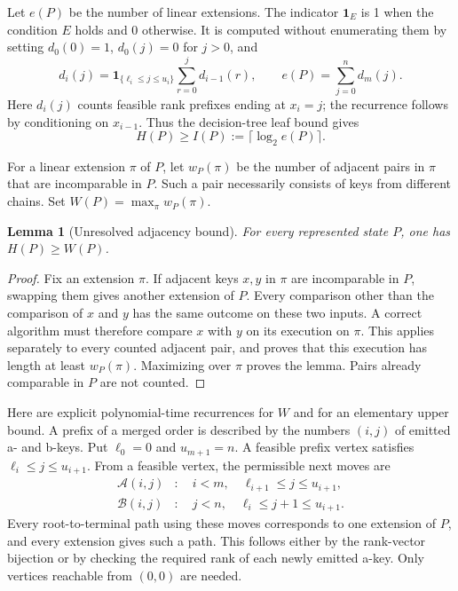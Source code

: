 \documentclass[11pt]{article}
\newtheorem{lemma}[theorem]{Lemma}
\theoremstyle{definition}
\theoremstyle{remark}
\begin{document}
Let $e(P)$ be the number of linear extensions. The indicator $\mathbf 1_E$ is 1 when the condition $E$ holds and 0 otherwise.  It is computed without
enumerating them by setting $d_0(0)=1$, $d_0(j)=0$ for $j>0$, and
\begin{equation}\label{ex:count}
 d_i(j)=\mathbf 1_{\{\ell_i\le j\le u_i\}}
                  \sum_{r=0}^j d_{i-1}(r),
 \qquad e(P)=\sum_{j=0}^n d_m(j).
\end{equation}
Here $d_i(j)$ counts feasible rank prefixes ending at $x_i=j$; the recurrence
follows by conditioning on $x_{i-1}$.  Thus the decision-tree leaf bound gives
\begin{equation}\label{ex:information}
                     H(P)\ge I(P):=\lceil\log_2 e(P)\rceil.
\end{equation}

For a linear extension $\pi$ of $P$, let $w_P(\pi)$ be the number of adjacent
pairs in $\pi$ that are incomparable in $P$.  Such a pair necessarily consists
of keys from different chains.  Set $W(P)=\max_\pi w_P(\pi)$.

\begin{lemma}[Unresolved adjacency bound]\label{ex:adjacency-lemma}
For every represented state $P$, one has $H(P)\ge W(P)$.

\end{lemma}
\begin{proof}
Fix an extension $\pi$.  If adjacent keys $x,y$ in $\pi$ are incomparable in
$P$, swapping them gives another extension of $P$.  Every comparison other
than the comparison of $x$ and $y$ has the same outcome on these two inputs.
A correct algorithm must therefore compare $x$ with $y$ on its execution on
$\pi$.  This applies separately to every counted adjacent pair, and proves
that this execution has length at least $w_P(\pi)$.  Maximizing over $\pi$
proves the lemma.  Pairs already comparable in $P$ are not counted.
\end{proof}

Here are explicit polynomial-time recurrences for $W$ and for an elementary
upper bound.  A prefix of a merged order is described by the numbers $(i,j)$
of emitted a- and b-keys.  Put $\ell_0=0$ and $u_{m+1}=n$.
A feasible prefix vertex satisfies $\ell_i\le j\le u_{i+1}$.
From a feasible vertex, the permissible next moves are
\begin{align*}
 \mathcal A(i,j)&:\quad i<m,\quad \ell_{i+1}\le j\le u_{i+1},\\
 \mathcal B(i,j)&:\quad j<n,\quad \ell_i\le j+1\le u_{i+1}.
\end{align*}
Every root-to-terminal path using these moves corresponds to one extension
of $P$, and every extension gives such a path.  This follows either by the
rank-vector bijection or by checking the required rank of each newly emitted
a-key.  Only vertices reachable from $(0,0)$ are needed.
\end{document}
